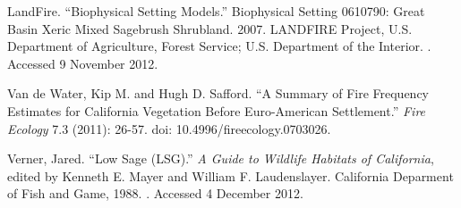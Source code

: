 \begin{hangparas}{.25in}{1} 
LandFire. ``Biophysical Setting Models.'' Biophysical Setting 0610790: Great Basin Xeric Mixed Sagebrush Shrubland. 2007. LANDFIRE Project, U.S. Department of Agriculture, Forest Service; U.S. Department of the Interior. . Accessed 9 November 2012.

Van de Water, Kip M. and Hugh D. Safford. ``A Summary of Fire Frequency Estimates for California Vegetation Before Euro-American Settlement.'' \emph{Fire Ecology} 7.3 (2011): 26-57. doi: 10.4996/fireecology.0703026.

Verner, Jared. ``Low Sage (LSG).'' \emph{A Guide to Wildlife Habitats of California}, edited by Kenneth E. Mayer and William F. Laudenslayer. California Deparment of Fish and Game, 1988. . Accessed 4 December 2012.
\end{hangparas}


